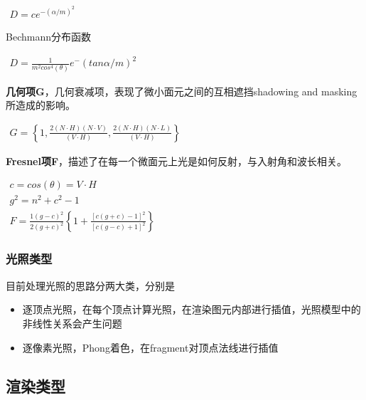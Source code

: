 \begin{math}
    \begin{aligned}
        D = ce^{-(\alpha / m)^2}
    \end{aligned}
\end{math}

Bechmann分布函数
\newline

\begin{math}
    \begin{aligned}
        D = \frac{1}{m^2cos^4(\theta)}e^-(tan\alpha / m)^2
    \end{aligned}
\end{math}

\textbf{几何项G}，几何衰减项，表现了微小面元之间的互相遮挡shadowing and masking所造成的影响。
\newline

\begin{math}
    \begin{aligned}
        G = \left\{
            1, \frac{2(N \cdot H)(N \cdot V)}{(V \cdot H)}, \frac{2(N \cdot H)(N \cdot L)}{(V \cdot H)} 
        \right\}
    \end{aligned}
\end{math}

\textbf{Fresnel项F}，描述了在每一个微面元上光是如何反射，与入射角和波长相关。
\newline

\begin{math}
    \begin{aligned}
        c = cos(\theta) = V \cdot H \\
        g^2 = n^2 + c^2 - 1 \\
    F = \frac{1(g-c)^2}{2(g+c)^2} \left\{ 1+\frac{[c(g+c)-1]^2}{[c(g-c)+1]^2} \right\}
    \end{aligned}
\end{math}


\subsubsection{光照类型}
目前处理光照的思路分两大类，分别是
\begin{itemize}
    \item {逐顶点光照，在每个顶点计算光照，在渲染图元内部进行插值，光照模型中的非线性关系会产生问题}
    \item {逐像素光照，Phong着色，在fragment对顶点法线进行插值}
\end{itemize}

\subsection{渲染类型}

